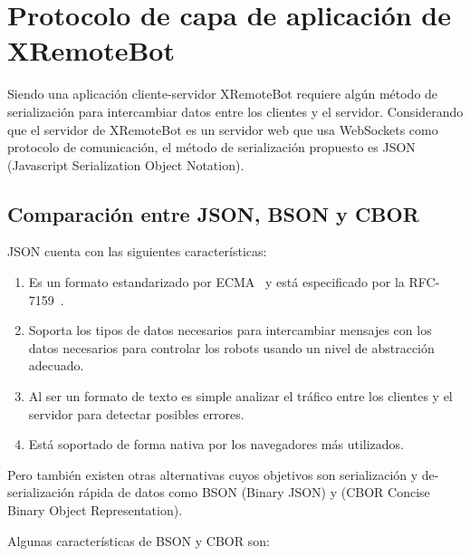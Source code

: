 \chapter{Protocolo de capa de aplicación de XRemoteBot}\label{cha:protocolo}
Siendo una aplicación cliente-servidor XRemoteBot requiere algún método de
serialización para intercambiar datos entre los clientes y el servidor.
Considerando que el servidor de XRemoteBot es un servidor web que usa WebSockets
como protocolo de comunicación, el método de serialización propuesto es JSON
(Javascript Serialization Object Notation).

\section{Comparación entre JSON, BSON y CBOR}\label{sec:serializacion}

JSON cuenta con las siguientes características:
\begin{enumerate}
    \item Es un formato estandarizado por ECMA~\citep{ecma-404}
        y está especificado por la RFC-7159~\citep{rfc-7159}.
    \item Soporta los tipos de datos necesarios para intercambiar mensajes con
        los datos necesarios para controlar los robots usando un nivel de
        abstracción adecuado.
    \item Al ser un formato de texto es simple analizar el tráfico entre los
        clientes y el servidor para detectar posibles errores.
    \item Está soportado de forma nativa por los navegadores más
        utilizados.%
\end{enumerate}

Pero también existen otras alternativas cuyos objetivos son serialización
y de-serialización rápida de datos
como BSON (Binary JSON) y (CBOR Concise Binary Object Representation).

Algunas características de BSON y CBOR son:


